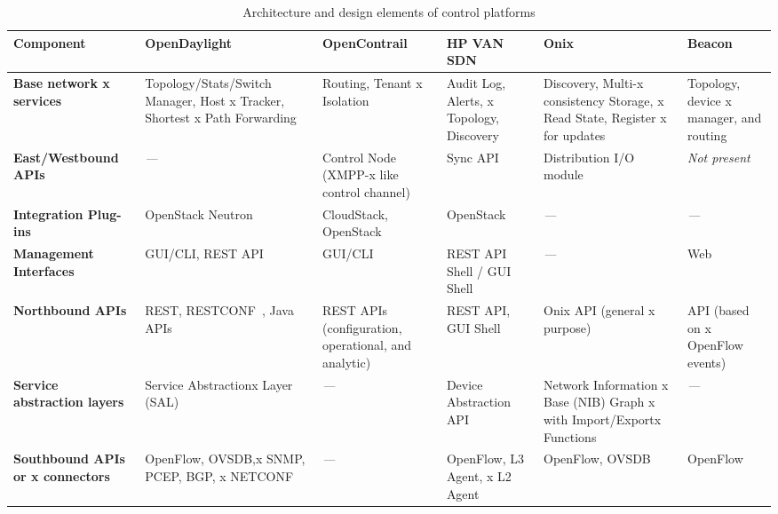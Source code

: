 {\renewcommand{\arraystretch}{1.4}
\begin{table}[!htp]
\caption{Architecture and design elements of control platforms}
\label{tab:controllerdesign}
\begin{center}
\footnotesize
\begin{tabularx}{\textwidth}{|p{1.9cm}|X|X|X|X|X|}
\hline
\textbf{Component} & \textbf{OpenDaylight} & \textbf{OpenContrail} & \textbf{HP VAN SDN} & \textbf{Onix} & \textbf{Beacon} \\\hline

\textbf{Base network \hfill {\color{white}x} services}     & Topology/Stats/Switch Manager, Host \hfill {\color{white}x} Tracker, Shortest \hfill {\color{white}x} Path Forwarding & Routing, Tenant \hfill {\color{white}x} Isolation & Audit Log, Alerts, \hfill{\color{white}x} Topology, Discovery & Discovery, Multi-\hfill{\color{white}x} consistency Storage, {\color{white}x} Read State, Register \hfill{\color{white}x} for updates  & Topology, device \hfill {\color{white}x} manager, and routing \\\hline

\textbf{East/Westbound APIs}       & \textit{---} & Control Node (XMPP-\hfill{\color{white}x} like control channel) & Sync API & Distribution I/O module & \textit{Not present} \\\hline

\textbf{Integration Plug-ins}  & OpenStack Neutron & CloudStack, OpenStack & OpenStack & \textit{---} & \textit{---} \\\hline

\textbf{Management Interfaces} & GUI/CLI, REST API & GUI/CLI & REST API Shell / GUI Shell & \textit{---} & Web \\\hline

\textbf{Northbound APIs}           & REST, RESTCONF~\cite{bierman2014restconf}, Java APIs & REST APIs (configuration, operational, and analytic) & REST API, GUI Shell & Onix API (general \hfill {\color{white}x} purpose) & API (based on \hfill {\color{white}x} OpenFlow events) \\\hline

\textbf{Service abstraction layers} & Service Abstraction\hfill {\color{white}x} Layer (SAL) & \textit{---} & Device Abstraction API & Network Information \hfill{\color{white}x} Base (NIB) Graph \hfill{\color{white}x} with Import/Export\hfill {\color{white}x} Functions & \textit{---} \\\hline

\textbf{Southbound APIs or \hfill {\color{white}x} connectors} & OpenFlow, OVSDB,\hfill{\color{white}x}  SNMP, PCEP, BGP, \hfill{\color{white}x} NETCONF & \textit{---} & OpenFlow, L3 Agent, \hfill {\color{white}x} L2 Agent & OpenFlow, OVSDB & OpenFlow \\\hline

\end{tabularx}
\end{center}
\end{table}
}


